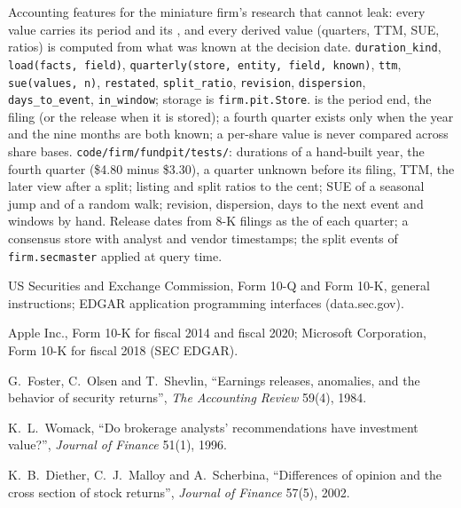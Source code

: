 \begin{build}
 Accounting features for the miniature firm's research that cannot leak: every value carries its period and its , and every derived value (quarters, TTM, SUE, ratios) is computed from what was known at the decision date.
 \texttt{duration\_kind}, \texttt{load(facts, field)}, \texttt{quarterly(store, entity, field, known)}, \texttt{ttm},
\texttt{sue(values, n)}, \texttt{restated}, \texttt{split\_ratio}, \texttt{revision}, \texttt{dispersion}, \texttt{days\_to\_event},
\texttt{in\_window}; storage is \texttt{firm.pit.Store}.
  is the period end,  the filing (or the release when it is stored); a fourth quarter exists only when
the year and the nine months are both known; a per-share value is never compared across share bases.
 \texttt{code/firm/fundpit/tests/}: durations of a hand-built year, the fourth quarter (\$4.80 minus \$3.30), a quarter
unknown before its filing, TTM, the later view after a split;  listing and split ratios to the cent; SUE of a seasonal jump and of
a random walk; revision, dispersion, days to the next event and windows by hand.
 Release dates from 8-K filings as the  of each quarter; a consensus store with analyst and vendor timestamps;
the split events of \texttt{firm.secmaster} applied at query time.
\end{build}

\begin{omsources}
\item US Securities and Exchange Commission, Form 10-Q and Form 10-K, general instructions; EDGAR application programming interfaces
(data.sec.gov).
\item Apple Inc., Form 10-K for fiscal 2014 and fiscal 2020; Microsoft Corporation, Form 10-K for fiscal 2018 (SEC EDGAR).
\item G.~Foster, C.~Olsen and T.~Shevlin, ``Earnings releases, anomalies, and the behavior of security returns'', \emph{The Accounting Review}
59(4), 1984.
\item K.~L.~Womack, ``Do brokerage analysts' recommendations have investment value?'', \emph{Journal of Finance} 51(1), 1996.
\item K.~B.~Diether, C.~J.~Malloy and A.~Scherbina, ``Differences of opinion and the cross section of stock returns'', \emph{Journal of
Finance} 57(5), 2002.
\end{omsources}

